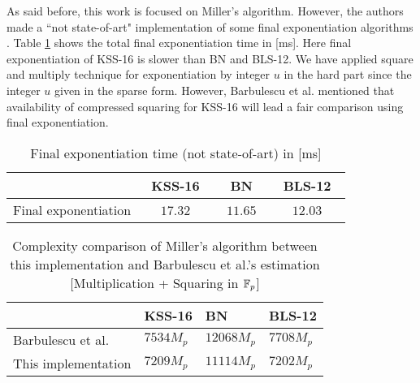 As said before, this work is focused on Miller's algorithm. However, the authors made a ``not state-of-art" implementation of some  final exponentiation algorithms \cite{EPRINT:GhaFou16b,SAC:FueKnaRod11,EPRINT:GhaFou16a}. 
Table \ref{com_fe} shows the total final exponentiation time in [ms].
Here final exponentiation of KSS-16 is slower than BN and BLS-12.  
We have applied square and multiply technique for exponentiation by integer $u$ in the hard part since the integer $u$ given in the sparse form.
However, Barbulescu et al. \cite{EPRINT:BarDuq17} mentioned that availability of compressed squaring \cite{EC:AKLGL11} for KSS-16 will lead a fair comparison using final exponentiation.
\renewcommand{\baselinestretch}{1.5}
\begin{table}[ht]
\centering
\caption{Final exponentiation time (not state-of-art) in [ms] }
\label{com_fe}
\begin{tabular}{l|c|c|c|}
\cline{2-4}
                                           & ~KSS-16~   & ~BN~       & ~BLS-12~   \\ \hline
\multicolumn{1}{|l|}{Final exponentiation} & ~$17.32 $~ & ~$11.65 $~ & ~$12.03 $~ \\ \hline
\end{tabular}
\end{table}
\renewcommand{\baselinestretch}{1.0}

\renewcommand{\baselinestretch}{1.5}
\begin{table}[ht]
	\centering
	\caption{Complexity comparison of Miller's algorithm between this implementation and Barbulescu et al.'s \cite{EPRINT:BarDuq17} estimation [Multiplication + Squaring in ${\mathbb{F}}_{p}$]}
	\label{com_com}
	\begin{tabular}{l|l|l|l|}
		\cline{2-4}
		& KSS-16     & BN          & BLS-12      \\ \hline
		\multicolumn{1}{|l|}{Barbulescu et al. \cite{EPRINT:BarDuq17}} & $ 7534 M_p$ & $12068 M_p$ & $7708 M_p$ \\ \hline
		\multicolumn{1}{|l|}{This implementation}         &     $7209 M_p$       &   $11114 M_p$          &        $7202 M_p$   \\ \hline
	\end{tabular}
\end{table}
\renewcommand{\baselinestretch}{1.0}

